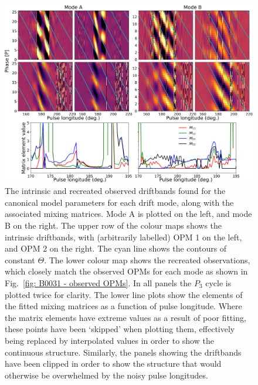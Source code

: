 \begin{landscape}
    \begin{figure}
        \begin{center}
            \includegraphics[height=0.66\textwidth]{Figures/B0031/canres_driftbands_2}
            \caption[Results for the canonical model]{The intrinsic and recreated observed driftbands found for the canonical model parameters for each drift mode, along with the associated mixing matrices. Mode A is plotted on the left, and mode B on the right. The upper row of the colour maps shows the intrinsic driftbands, with (arbitrarily labelled) OPM 1 on the left, and OPM 2 on the right. The cyan line shows the contours of constant $\Theta$. The lower colour map shows the recreated observations, which closely match the observed OPMs for each mode as shown in Fig.~\ref{fig: B0031 - observed OPMs}. In all panels the $P_3$ cycle is plotted twice for clarity. The lower line plots show the elements of the fitted mixing matrices as a function of pulse longitude. Where the matrix elements have extreme values as a result of poor fitting, these points have been `skipped' when plotting them, effectively being replaced by interpolated values in order to show the continuous structure. Similarly, the panels showing the driftbands have been clipped in order to show the structure that would otherwise be overwhelmed by the noisy pulse longitudes.}
            \label{fig: B0031 - canonical model driftbands and matrices}
        \end{center}
    \end{figure}
\end{landscape}
